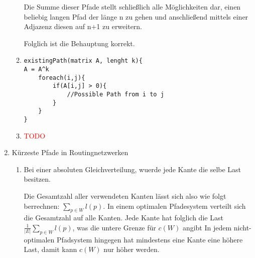 \documentclass{article}
\begin{document}
\begin{enumerate}[\bfseries1.]
\begin{enumerate}
Die Summe dieser Pfade stellt schließlich alle Möglichkeiten dar, einen beliebig
langen Pfad der länge n zu gehen und anschließend mittels einer Adjazenz diesen
auf n+1 zu erweitern.

Folglich ist die Behauptung korrekt.



        \item
\begin{verbatim}
existingPath(matrix A, lenght k){
A = A^k
    foreach(i,j){
        if(A[i,j] > 0){
            //Possible Path from i to j
        }
    }
}
\end{verbatim}
        \item \textcolor{red}{TODO}
    \end{enumerate}  
\item Kürzeste Pfade in Routingnetzwerken
    \begin{enumerate}
       \item
          Bei einer absoluten Gleichverteilung, wuerde jede Kante die selbe Last besitzen.

          Die Gesamtzahl aller verwendeten Kanten lässt sich also wie folgt berrechnen: $\sum_{p \in W} l(p)$. 
          In einem optimalen Pfadesystem verteilt sich die Gesamtzahl auf alle Kanten. 
          Jede Kante hat folglich die Last $\frac{1}{|E|} \sum_{p \in W} l(p)$, was die untere Grenze für $c(W)$ angibt
          In jedem nicht-optimalen Pfadsystem hingegen hat mindestens eine Kante
          eine höhere Last, damit kann $c(W)$ nur höher werden.

    \end{enumerate}  
\end{enumerate}
\end{document}

